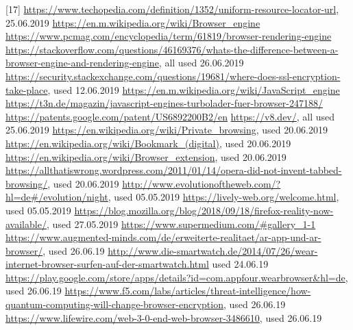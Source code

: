 \documentclass[runningheads]{llncs}
\begin{document}
	[17] \url{https://www.techopedia.com/definition/1352/uniform-resource-locator-url}, 25.06.2019
	\newline
	[18]
	\url{https://en.m.wikipedia.org/wiki/Browser_engine}
	\newline
	\url{https://www.pcmag.com/encyclopedia/term/61819/browser-rendering-engine}
	\newline
	\url{https://stackoverflow.com/questions/46169376/whats-the-difference-between-a-browser-engine-and-rendering-engine}, all used 26.06.2019
	\newline
	[19]\url{https://security.stackexchange.com/questions/19681/where-does-ssl-encryption-take-place}, used 12.06.2019
	\newline
	[20] \url{https://en.m.wikipedia.org/wiki/JavaScript_engine}
	\newline \url{https://t3n.de/magazin/javascript-engines-turbolader-fuer-browser-247188/}
	\newline
	\url{https://patents.google.com/patent/US6892200B2/en}
	\newline
	\url{https://v8.dev/}, all used 25.06.2019
	\newline
	[21] \url{https://en.wikipedia.org/wiki/Private_browsing}, used 20.06.2019
	\newline
	[22] \url{https://en.wikipedia.org/wiki/Bookmark_(digital)}, used 20.06.2019
	\newline
	[23] \url{https://en.wikipedia.org/wiki/Browser_extension}, used 20.06.2019
	\newline
	[24] \url{https://allthatiswrong.wordpress.com/2011/01/14/opera-did-not-invent-tabbed-browsing/}, used 20.06.2019
	\newline
	[25] \url{http://www.evolutionoftheweb.com/?hl=de#/evolution/night}, used 05.05.2019
	\newline
	[26] \url{
	https://lively-web.org/welcome.html}, used 05.05.2019
	\newline
	[27] \url{https://blog.mozilla.org/blog/2018/09/18/firefox-reality-now-available/}, used 27.05.2019
	\newline
	[28]
	\url{https://www.supermedium.com/#gallery_1-1}
	\newline	
	[29] \url{https://www.augmented-minds.com/de/erweiterte-realitaet/ar-app-und-ar-browser/}, used 26.06.19
	\newline
	[30]
	\url{http://www.die-smartwatch.de/2014/07/26/wear-internet-browser-surfen-auf-der-smartwatch.html} used 24.06.19
	\newline
	[31] \url{
	https://play.google.com/store/apps/details?id=com.appfour.wearbrowser&hl=de}, used 26.06.19
	\newline
	[32] \url{	https://www.f5.com/labs/articles/threat-intelligence/how-quantum-computing-will-change-browser-encryption}, used 26.06.19
	\newline
	[33] \url{
	https://www.lifewire.com/web-3-0-end-web-browser-3486610}, used 26.06.19
	\newline
\end{document}
